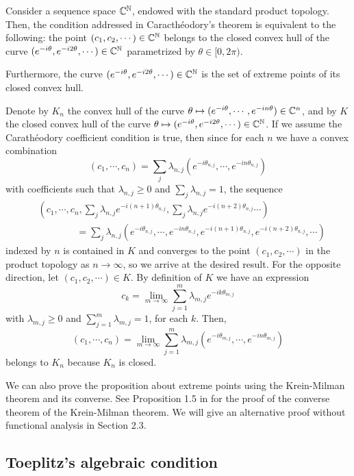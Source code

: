 \documentclass[a4paper]{article}
\begin{document}
\begin{prop}
Consider a sequence space $\mathbb{C}^{\mathbb{N}}$, endowed with the standard product topology.
Then, the condition addressed in Caracth\'eodory's theorem is equivalent to the following: the point $(c_1,c_2,\cdots)\in\mathbb{C}^{\mathbb{N}}$ belongs to the closed convex hull of the curve $(e^{-i\theta},e^{-i2\theta},\cdots)\in\mathbb{C}^{\mathbb{N}}$ parametrized by $\theta\in[0,2\pi)$.

Furthermore, the curve $(e^{-i\theta},e^{-i2\theta},\cdots)\in\mathbb{C}^{\mathbb{N}}$ is the set of extreme points of its closed convex hull.
\end{prop}
\begin{pf}
Denote by $K_n$ the convex hull of the curve $\theta\mapsto(e^{-i\theta},\cdots,e^{-in\theta})\in\mathbb{C}^n$, and by $K$ the closed convex hull of the curve $\theta\mapsto(e^{-i\theta},e^{-i2\theta},\cdots)\in\mathbb{C}^{\mathbb{N}}$.
If we assume the Carath\'eodory coefficient condition is true, then since for each $n$ we have a convex combination
\[(c_1,\cdots,c_n)=\sum_j\lambda_{n,j}(e^{-i\theta_{n,j}},\cdots,e^{-in\theta_{n,j}})\]
with coefficients such that $\lambda_{n,j}\ge0$ and $\sum_j\lambda_{n,j}=1$, the sequence
\begin{align*}
&(c_1,\cdots,c_n,\sum_j\lambda_{n,j}e^{-i(n+1)\theta_{n,j}},\sum_j\lambda_{n,j}e^{-i(n+2)\theta_{n,j}}\cdots)\\
&\qquad\qquad=\sum_j\lambda_{n,j}(e^{-i\theta_{n,j}},\cdots,e^{-in\theta_{n,j}},e^{-i(n+1)\theta_{n,j}},e^{-i(n+2)\theta_{n,j}},\cdots)
\end{align*}
indexed by $n$ is contained in $K$ and converges to the point $(c_1,c_2,\cdots)$ in the product topology as $n\to\infty$, so we arrive at the desired result.
For the opposite direction, let $(c_1,c_2,\cdots)\in K$.
By definition of $K$ we have an expression
\[c_k=\lim_{m\to\infty}\sum_{j=1}^m\lambda_{m,j}e^{-ik\theta_{m,j}}\]
with $\lambda_{m,j}\ge0$ and $\sum_{j=1}^m\lambda_{m,j}=1$, for each $k$.
Then,
\[(c_1,\cdots,c_n)=\lim_{m\to\infty}\sum_{j=1}^m\lambda_{m,j}(e^{-i\theta_{m,j}},\cdots,e^{-in\theta_{m,j}})\]
belongs to $K_n$ because $K_n$ is closed.

We can also prove the proposition about extreme points using the Krein-Milman theorem and its converse.
See Proposition 1.5 in \cite{phelps2001lectures} for the proof of the converse theorem of the Krein-Milman theorem.
We will give an alternative proof without functional analysis in Section 2.3.
\end{pf}


\subsection{Toeplitz's algebraic condition}
\end{document}
